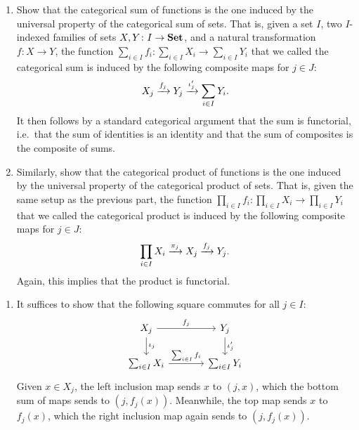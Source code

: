 \documentclass[Book-Poly]{subfiles}
\begin{document}
\begin{exercise} \label{exc.sum-prod-func}
    \begin{enumerate}
        \item Show that the categorical sum of functions is the one induced by the universal property of the categorical sum of sets.
        That is, given a set $I$, two $I$-indexed families of sets $X,Y\colon I\to\mathbf{Set}$, and a natural transformation $f\colon X\to Y$, the function $\sum_{i\in I}f_i\colon\sum_{i\in I}X_i\to\sum_{i\in I}Y_i$ that we called the categorical sum is induced by the following composite maps for $j\in J$:
        \[
        X_j\xrightarrow{f_j}Y_j\xrightarrow{\iota'_j}\sum_{i\in I}Y_i.
        \]
        It then follows by a standard categorical argument that the sum is functorial, i.e.\ that the sum of identities is an identity and that the sum of composites is the composite of sums.

        \item Similarly, show that the categorical product of functions is the one induced by the universal property of the categorical product of sets.
        That is, given the same setup as the previous part, the function $\prod_{i\in I}f_i\colon\prod_{i\in I}X_i\to\prod_{i\in I}Y_i$ that we called the categorical product is induced by the following composite maps for $j\in J$:
        \[
        \prod_{i\in I}X_i\xrightarrow{\pi_j}X_j\xrightarrow{f_j}Y_j.
        \]
        Again, this implies that the product is functorial. \qedhere
    \end{enumerate}
    \begin{solution}
        \begin{enumerate}
            \item It suffices to show that the following square commutes for all $j\in I$:
            \[
            \begin{tikzcd}[column sep=large]
                X_j \ar[d, "\iota_j"] \ar[r, "f_j"] & Y_j \ar[d, "\iota'_j"] \\
                \sum_{i\in I}X_i \ar[r, "\sum_{i\in I}f_i"] & \sum_{i\in I}Y_i
            \end{tikzcd}
            \]
            Given $x\in X_j$, the left inclusion map sends $x$ to $(j,x)$, which the bottom sum of maps sends to $(j,f_j(x))$.
            Meanwhile, the top map sends $x$ to $f_j(x)$, which the right inclusion map again sends to $(j,f_j(x))$.


\end{enumerate}
\end{solution}
\end{exercise}
\end{document}
